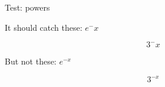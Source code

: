 \documentclass{article}
\begin{document}
Test: powers

It should catch these: $e^-x$

\[
    3^-x
\]

But not these: $e^{-x}$

\[
    3^{-x}
\]
\end{document}

